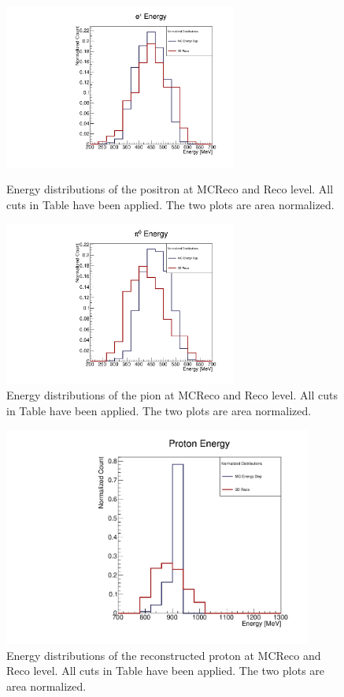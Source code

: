 \documentclass[a4paper, 10pt]{article}
\begin{document}
\begin{figure}[h!]
\centering
\begin{minipage}{0.45\textwidth}
\centering
\includegraphics[width=3in]{pPi0E/e_eplus_postcutcomp.pdf}
\caption{Energy distributions of the  positron at MCReco and Reco level. All cuts in Table \label{t3} have been applied. The two plots are area normalized.}
\label{figure1}
\end{minipage}\hfill
\begin{minipage}{0.45\textwidth}
\centering
\includegraphics[width=3in]{pPi0E/e_pion_postcutcomp.pdf}
\caption{Energy distributions of the pion at MCReco and Reco level. All cuts in Table \label{t3} have been applied. The two plots are area normalized.}
\label{f2}
\end{minipage}
\end{figure}


\begin{figure}[h!]
\begin{center}
\includegraphics[width=4in]{pPi0E/e_proton_postcutcomp.pdf}
\caption{Energy distributions of the reconstructed proton at MCReco and Reco level. All cuts in Table \label{t3} have been applied. The two plots are area normalized.}
\label{f3}
\end{center}
\end{figure}
\end{document}
